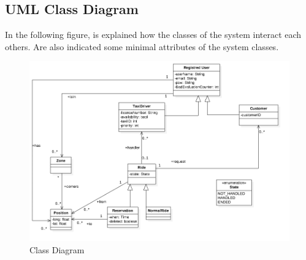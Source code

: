 \subsection{UML Class Diagram}
In the following figure, is explained how the classes of the system interact each others. Are also indicated some minimal attributes of the system classes.

	\begin{figure}[H]
		\centering
		\includegraphics[width=\textwidth, scale=0.5]{IMG/ClassDiagram.png}
		\caption{Class Diagram}\label{sec:ClassDiagramFigure}
	\end{figure}